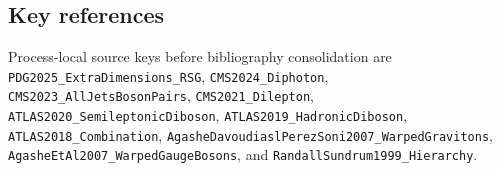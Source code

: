 \subsection*{Key references}
Process-local source keys before bibliography consolidation are
\texttt{PDG2025\_ExtraDimensions\_RSG}, \texttt{CMS2024\_Diphoton},
\texttt{CMS2023\_AllJetsBosonPairs}, \texttt{CMS2021\_Dilepton},
\texttt{ATLAS2020\_SemileptonicDiboson},
\texttt{ATLAS2019\_HadronicDiboson}, \texttt{ATLAS2018\_Combination},
\texttt{AgasheDavoudiaslPerezSoni2007\_WarpedGravitons},
\texttt{AgasheEtAl2007\_WarpedGaugeBosons}, and
\texttt{RandallSundrum1999\_Hierarchy}.
